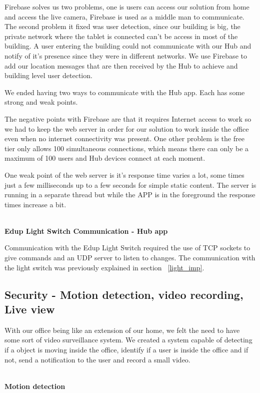 Firebase solves us two problems, one is users can access our solution from home and access the live camera, Firebase is used as a middle man to communicate. The second problem it fixed was user detection, since our building is big, the private network where the tablet is connected can't be access in most of the building. A user entering the building could not communicate with our Hub and notify of it's presence since they were in different networks. We use Firebase to add our location messages that are then received by the Hub to achieve and building level user detection.

We ended having two ways to communicate with the Hub app. Each has some strong and weak points. 

The negative points with Firebase are that it requires Internet access to work so we had to keep the web server in order for our solution to work inside the office even when no internet connectivity was present. One other problem is the free tier only allows 100 simultaneous connections, which means there can only be a maximum of 100 users and Hub devices connect at each moment.

One weak point of the web server is it's response time varies a lot, some times just a few milliseconds up to a few seconds for simple static content. The server is running in a separate thread but while the APP is in the foreground the response times increase a bit.



\mbox{}\\
\textbf{Edup Light Switch Communication - Hub app}

Communication with the Edup Light Switch required the use of TCP sockets to give commands and an UDP server to listen to changes. The communication with the light switch was previously explained in section ~\ref{light_imp}.


\subsection{Security - Motion detection, video recording, Live view}\label{imp:security_motion}

With our office being like an extension of our home, we felt the need to have some sort of video surveillance system. We created a system capable of detecting if a object is moving inside the office, identify if a user is inside the office and if not, send a notification to the user and record a small video.


\mbox{}\\
\textbf{Motion detection}

